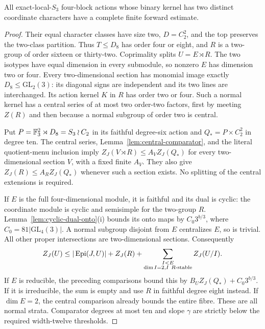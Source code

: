 \begin{proposition}\label{prop:four-s3-two-signs}
All exact-local-$S_3$ four-block actions whose binary kernel has two
distinct coordinate characters have a complete finite forward estimate.
\end{proposition}
\begin{proof}
Their equal character classes have size two, $D=C_2^2$, and the
top preserves the two-class partition. Thus $T\leq D_8$ has order
four or eight, and $R$ is a two-group of order sixteen or thirty-two.
Coprimality splits $U=E\rtimes R$. The two isotypes have equal
dimension in every submodule, so nonzero $E$ has dimension two or
four. Every two-dimensional section has monomial image exactly
$D_8\leq\mathrm{GL}_2(3)$: its diagonal signs are independent
and its two lines are interchanged. Its action kernel $K$ in $R$
has order two or four. Such a normal kernel has a central series
of at most two order-two factors, first by meeting $Z(R)$ and
then because a normal subgroup of order two is central.

Put $P=\mathbb F_3^2\rtimes D_8=S_3\wr C_2$ in its faithful degree-six
action and $Q_*=P\times C_2^2$ in degree ten. The central series,
Lemma~\ref{lem:central-comparator}, and the literal quotient-menu
inclusion imply $Z_J(V\rtimes R)\leq A_VZ_J(Q_*)$ for every
two-dimensional section $V$, with a fixed finite $A_V$.
They also give $Z_J(R)\leq A_RZ_J(Q_*)$ whenever such a section
exists. No splitting of the central extensions is required.

If $E$ is the full four-dimensional module, it is faithful and its
dual is cyclic: the coordinate module is cyclic and semisimple for
the two-group $R$. Lemma~\ref{lem:cyclic-dual-onto}(i) bounds its
onto maps by $C_0 3^{b/3}$, where
$C_0=81|\mathrm{GL}_4(3)|$. A normal subgroup disjoint from $E$
centralizes $E$, so is trivial. All other proper intersections are
two-dimensional sections. Consequently
\[
 Z_J(U)\leq |\Epi(J,U)|+Z_J(R)
       +\sum_{\substack{I<E\\\dim I=2, I\ R\text{-stable}}}Z_J(U/I).
\]
If $E$ is reducible, the preceding comparisons bound this by
$B_UZ_J(Q_*)+C_0 3^{b/3}$. If it is irreducible, the sum is empty
and use $R$ in faithful degree eight instead. If $\dim E=2$, the
central comparison already bounds the entire fibre. These are all
normal strata. Comparator degrees at most ten and slope $\gamma$
are strictly below the required width-twelve thresholds.
\end{proof}

